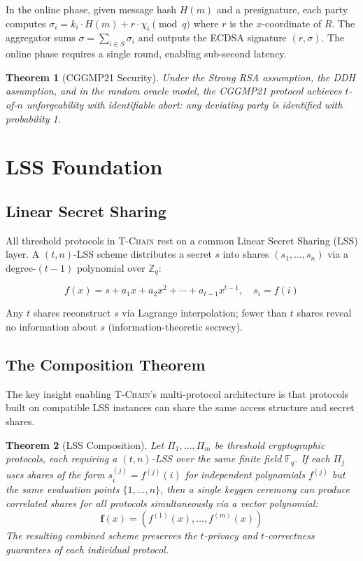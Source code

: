 \documentclass[11pt,letterpaper]{article}
\newtheorem{theorem}{Theorem}
\theoremstyle{definition}
\theoremstyle{remark}
\newcommand{\TChain}{\textsc{T-Chain}}
\newcommand{\CGGMP}{\textsc{CGGMP21}}
\newcommand{\LSS}{\textsc{LSS}}
\begin{document}
In the online phase, given message hash $H(m)$ and a presignature, each party computes $\sigma_i = k_i \cdot H(m) + r \cdot \chi_i \pmod{q}$ where $r$ is the $x$-coordinate of $R$. The aggregator sums $\sigma = \sum_{i \in S} \sigma_i$ and outputs the ECDSA signature $(r, \sigma)$. The online phase requires a single round, enabling sub-second latency.

\begin{theorem}[CGGMP21 Security]
\label{thm:cggmp-security}
Under the Strong RSA assumption, the DDH assumption, and in the random oracle model, the \CGGMP{} protocol achieves $t$-of-$n$ unforgeability with identifiable abort: any deviating party is identified with probability 1.
\end{theorem}

\section{LSS Foundation}
\label{sec:lss}

\subsection{Linear Secret Sharing}

All threshold protocols in \TChain{} rest on a common Linear Secret Sharing (\LSS{}) layer. A $(t, n)$-\LSS{} scheme distributes a secret $s$ into shares $(s_1, \ldots, s_n)$ via a degree-$(t{-}1)$ polynomial over $\mathbb{Z}_q$:

\begin{equation}
f(x) = s + a_1 x + a_2 x^2 + \cdots + a_{t-1} x^{t-1}, \quad s_i = f(i)
\end{equation}

Any $t$ shares reconstruct $s$ via Lagrange interpolation; fewer than $t$ shares reveal no information about $s$ (information-theoretic secrecy).

\subsection{The Composition Theorem}

The key insight enabling \TChain{}'s multi-protocol architecture is that protocols built on compatible \LSS{} instances can share the same access structure and secret shares.

\begin{theorem}[LSS Composition]
\label{thm:composition}
Let $\Pi_1, \ldots, \Pi_m$ be threshold cryptographic protocols, each requiring a $(t, n)$-\LSS{} over the same finite field $\mathbb{F}_q$. If each $\Pi_j$ uses shares of the form $s_i^{(j)} = f^{(j)}(i)$ for independent polynomials $f^{(j)}$ but the same evaluation points $\{1, \ldots, n\}$, then a single keygen ceremony can produce correlated shares for all protocols simultaneously via a vector polynomial:
\[
\mathbf{f}(x) = (f^{(1)}(x), \ldots, f^{(m)}(x))
\]
The resulting combined scheme preserves the $t$-privacy and $t$-correctness guarantees of each individual protocol.
\end{theorem}
\end{document}
